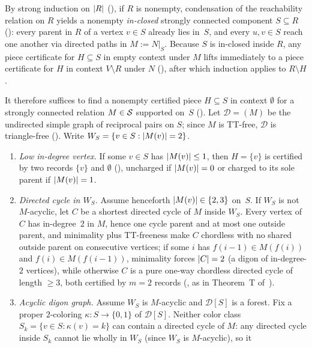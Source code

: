 \begin{outline}
By strong induction on $\lvert R \rvert$ (), if $R$ is nonempty, condensation of the reachability relation
on $R$ yields a nonempty \emph{in-closed} strongly connected component $S \subseteq R$ ():
every parent in $R$ of a vertex $v \in S$ already lies in~$S$, and every $u, v \in S$ reach one another via directed paths
in $M := N|_S$. Because $S$ is in-closed inside $R$, any piece certificate for $H \subseteq S$ in empty context under $M$
lifts immediately to a piece certificate for $H$ in context $V \setminus R$ under $N$ (), after
which induction applies to $R \setminus H$.

It therefore suffices to find a nonempty certified piece $H \subseteq S$ in context $\emptyset$ for a strongly connected
relation $M \in \mathcal{S}$ supported on~$S$ (). Let $\mathcal{D} = {}$$(M)$ be
the undirected simple graph of reciprocal pairs on $S$; since $M$ is TT-free, $\mathcal{D}$ is triangle-free
(). Write $W_S = \{v \in S : \lvert M(v) \rvert = 2\}$.
\begin{enumerate}
\item \emph{Low in-degree vertex.} If some $v \in S$ has $\lvert M(v) \rvert \le 1$, then $H = \{v\}$ is certified by two records
  $\{v\}$ and $\emptyset$ (), uncharged if $\lvert M(v) \rvert = 0$ or charged to its sole parent if
  $\lvert M(v) \rvert = 1$.
\item \emph{Directed cycle in $W_S$.} Assume henceforth $\lvert M(v) \rvert \in \{2, 3\}$ on~$S$. If $W_S$ is not $M$-acyclic,
  let $C$ be a shortest directed cycle of $M$ inside $W_S$. Every vertex of $C$ has in-degree~$2$ in $M$, hence one cycle
  parent and at most one outside parent, and minimality plus TT-freeness make $C$ chordless with no shared outside parent
  on consecutive vertices; if some $i$ has $f(i-1) \in M(f(i))$ and $f(i) \in M(f(i-1))$, minimality forces $\lvert C \rvert = 2$
  (a digon of in-degree-$2$ vertices), while otherwise $C$ is a pure one-way chordless directed cycle of length $\ge 3$,
  both certified by $m = 2$ records (, as in Theorem~T of~\cite{SeventhPaper2026}).
\item \emph{Acyclic digon graph.} Assume $W_S$ is $M$-acyclic and $\mathcal{D}[S]$ is a forest. Fix a proper $2$-coloring
  $\kappa : S \to \{0, 1\}$ of $\mathcal{D}[S]$. Neither color class $S_k = \{v \in S : \kappa(v) = k\}$ can contain a
  directed cycle of $M$: any directed cycle inside $S_k$ cannot lie wholly in $W_S$ (since $W_S$ is $M$-acyclic), so it

\end{enumerate}
\end{outline}
